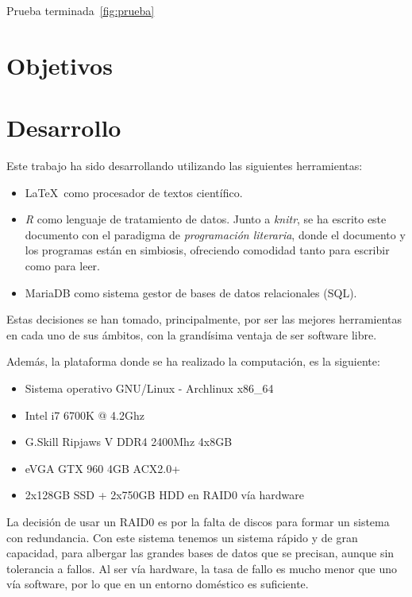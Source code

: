 \documentclass[a4paper,11pt]{book}\usepackage[]{graphicx}\usepackage[]{color}
\theoremstyle{plain}
\theoremstyle{definition}
\begin{document}
Prueba terminada~\ref{fig:prueba}


\chapter{Objetivos} 


\chapter{Desarrollo}



Este trabajo ha sido desarrollando utilizando las siguientes herramientas:

\begin{itemize}
  \item \LaTeX \, como procesador de textos científico.
  \item \emph{R} como lenguaje de tratamiento de datos. Junto a \emph{knitr},
  se ha escrito este documento con el paradigma de \emph{programación literaria},
  donde el documento y los programas están en simbiosis, ofreciendo comodidad
  tanto para escribir como para leer.
  \item MariaDB como sistema gestor de bases de datos relacionales (SQL).
\end{itemize}

Estas decisiones se han tomado, principalmente, por ser las mejores herramientas
en cada uno de sus ámbitos, con la grandísima ventaja de ser software libre.

Además, la plataforma donde se ha realizado la computación, es la siguiente:
\begin{itemize}
  \item Sistema operativo GNU/Linux - Archlinux x86\_64
  \item Intel i7 6700K @ 4.2Ghz
  \item G.Skill Ripjaws V DDR4 2400Mhz 4x8GB
  \item eVGA GTX 960 4GB ACX2.0+
  \item 2x128GB SSD + 2x750GB HDD en RAID0 vía hardware
\end{itemize}

La decisión de usar un RAID0 es por la falta de discos para formar un sistema
con redundancia. Con este sistema tenemos un sistema rápido y de gran capacidad,
para albergar las grandes bases de datos que se precisan, aunque sin tolerancia
a fallos. Al ser vía hardware, la tasa de fallo es mucho menor que uno vía
software, por lo que en un entorno doméstico es suficiente.
\end{document}
